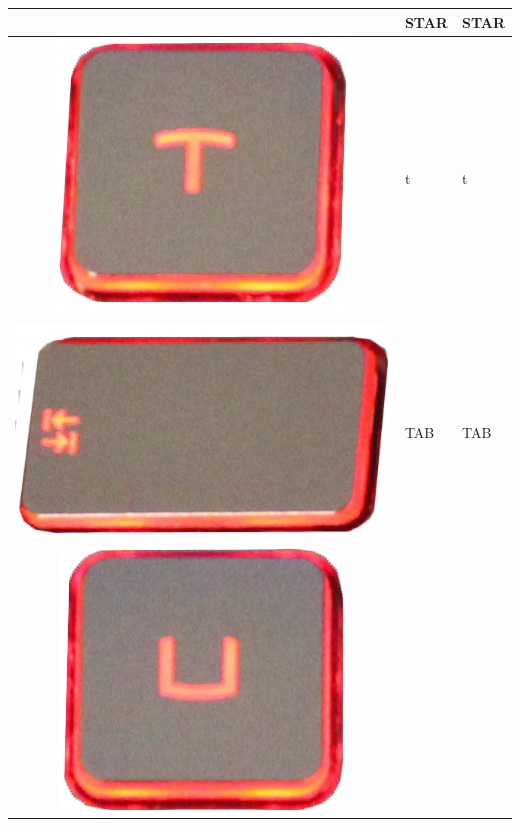 \begin{longtable}{|cll|}
\begin{minipage}[c]{.4\textwidth}
\vspace{0.2cm}
\end{minipage} & STAR & STAR\\
\hline
\begin{minipage}[c]{.4\textwidth}
\vspace{0.2cm}
\includegraphics[scale=0.08]{Images/KeyMapping/t}
\vspace{0.2cm}
\end{minipage} & t & t\\
\hline
\begin{minipage}[c]{.4\textwidth}
\vspace{0.2cm}
\includegraphics[scale=0.08]{Images/KeyMapping/TAB}
\vspace{0.2cm}
\end{minipage} & TAB & TAB\\
\hline
\begin{minipage}[c]{.4\textwidth}
\vspace{0.2cm}
\includegraphics[scale=0.08]{Images/KeyMapping/u}

\end{minipage}
\end{longtable}
